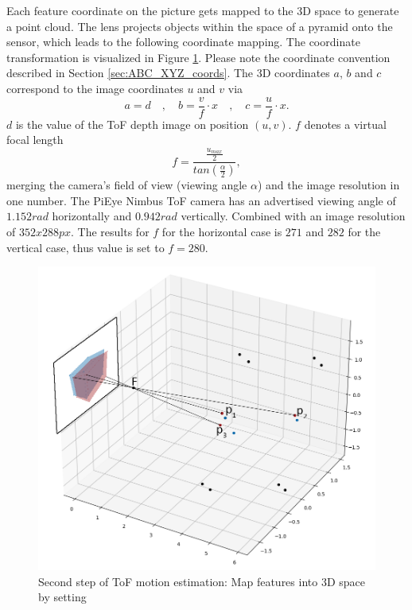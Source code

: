 Each feature coordinate on the picture gets mapped to the 3D space to generate a point cloud. The lens projects objects within the space of a pyramid onto the sensor, which leads to the following coordinate mapping. The coordinate transformation is visualized in Figure \ref{im:SiftCoordTransform}. Please note the coordinate convention described in Section \ref{sec:ABC_XYZ_coords}. The 3D coordinates $a$, $b$ and $c$ correspond to the image coordinates $u$ and $v$ via 
\begin{equation*}
    a = d \quad,\quad b = \frac{v}{f}\cdot x \quad,\quad c = \frac{u}{f}\cdot x.
\end{equation*}
$d$ is the value of the ToF depth image on position $(u,v)$. $f$ denotes a virtual focal length
\begin{equation*}
     f=\frac{\tfrac{u_{max}}{2}}{tan(\tfrac{\alpha}{2})},
\end{equation*}
merging the camera's field of view (viewing angle $\alpha$) and the image resolution in one number.
The PiEye Nimbus ToF camera has an advertised viewing angle of $1.152rad$ horizontally and $0.942rad$ vertically. Combined with an image resolution of $352 x 288px$. The results for $f$ for the horizontal case is $271$ and $282$ for the vertical case, thus value is set to $f = 280$.
\begin{figure}[H]
    \centering
    \includegraphics[width=1.0\textwidth]{images/2d_to_3d.png}
    \caption{Second step of ToF motion estimation: Map features into 3D space by setting }
    \label{im:SiftCoordTransform}
\end{figure}
